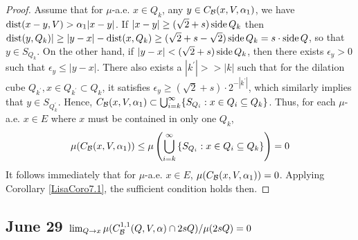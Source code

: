 \begin{proof}
    Assume that for $\mu$-a.e. $x\in Q_k$, any $y\in C_\mathcal B(x, V, \alpha_1)$, we have $\operatorname{dist}(x-y,V)>\alpha_1|x-y|$. If $|x-y|\geq (\sqrt{2} +s)\operatorname{side} Q_k$ then $\operatorname{dist}(y, Q_k)|\geq |y-x|-\operatorname{dist}(x, Q_k)\geq (\sqrt{2} +s-\sqrt{2})\operatorname{side} Q_k = s\cdot\operatorname{side} Q$, so that $y\in S_{Q_k}$. On the other hand, if $|y-x|<(\sqrt{2} +s)\operatorname{side} Q_k$, then there exists $\epsilon_y>0$ such that $\epsilon_y\leq |y-x|$. There also exists a $|k^\prime|>>|k|$ such that for the dilation cube $Q_{k^\prime}, x\in Q_{k^\prime}\subset Q_k$, it satisfies $\epsilon_y\geq (\sqrt{2} +s)\cdot2^{-|k^\prime|}$, which similarly implies that $y\in S_{Q_k^\prime}$. Hence, $C_\mathcal B(x, V, \alpha_1)\subset \bigcup_{i=k}^\infty \{S_{Q_i}: x\in Q_i\subseteq Q_k\}$. Thus, for each $\mu$-a.e. $x\in E$ where $x$ must be contained in only one $Q_k$,
    \begin{equation*}
        \begin{split}
            \mu(C_\mathcal B(x, V, \alpha_1))\leq \mu\left( \bigcup_{i=k}^\infty \left\{S_{Q_i}:x\in Q_i\subseteq Q_k\right\}\right) = 0
        \end{split}
    \end{equation*}
    It follows immediately that for $\mu$-a.e. $x\in E$, $\mu(C_\mathcal B(x, V, \alpha_1)) = 0$. Applying Corollary \ref{LisaCoro7.1}, the sufficient condition holds then.
\end{proof}




\newpage
\subsection{June 29 \texorpdfstring{$\lim_{Q\rightarrow x}\mu(C^{1,1}_\mathcal B(Q, V, \alpha)\cap 2sQ)/\mu(2sQ) = 0$}{Lg}}

